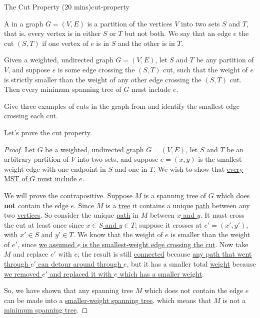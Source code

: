 \documentclass{tufte-handout}
\begin{document}
\begin{model*}{The Cut Property (20 mins)}{cut-property}
  \begin{center}
    
  \end{center}

  \begin{defn}
    A  in a graph $G = (V,E)$ is a partition of the vertices
    $V$ into two sets $S$ and $T$, that is, every vertex is in either
    $S$ or $T$ but not both.  We say that an edge $e$ 
    the cut $(S,T)$ if one vertex of $e$ is in $S$ and the other is in
    $T$.
  \end{defn}

  \begin{thm}
    Given a weighted, undirected graph $G = (V,E)$, let $S$ and $T$ be
    any partition of $V$, and suppose $e$ is some edge crossing the
    $(S,T)$ cut, such that the weight of $e$ is strictly smaller than
    the weight of any other edge crossing the $(S,T)$ cut.  Then every
    minimum spanning tree of $G$ must include $e$.
  \end{thm}
\end{model*}

\begin{questions}
\item Give three examples of cuts in the graph from
   and identify the smallest edge crossing
  each cut.
\end{questions}

Let's prove the cut property.

\newcommand{\filled}[1]{\underline{#1}}

\begin{proof}
  Let $G$ be a weighted, undirected graph $G = (V,E)$, let $S$ and $T$
  be an arbitrary partition of $V$ into two sets, and suppose
  $e = (x,y)$ is the smallest-weight edge with one endpoint in $S$ and
  one in $T$.  We wish to show that \filled{every MST of $G$ must
    include $e$}.

  We will prove the contrapositive. Suppose $M$ is a spanning tree of
  $G$ which does \textbf{not} contain the edge $e$.  Since $M$ is a
  \filled{tree} it contains a unique \filled{path} between any two
  \filled{vertices}. So consider the unique \filled{path} in $M$
  between \filled{$x$ and $y$}. It must cross the cut at least once
  since \filled{$x \in S$ and $y \in T$}; suppose it crosses at
  $e' = (x',y')$, with $x' \in S$ and $y' \in T$.  We know that the
  weight of $e$ is smaller than the weight of $e'$, since \filled{we
    assumed $e$ is the smallest-weight edge crossing the cut}. Now
  take $M$ and replace \filled{$e'$} with \filled{$e$}; the result is
  still \filled{connected} because \filled{any path that went through
    $e'$ can detour around through $e$}, but it has a smaller total
  \filled{weight} because \filled{we removed $e'$ and replaced it with
  $e$ which has a smaller weight}.

So, we have shown that any spanning tree $M$ which does not contain
the edge $e$ can be made into a \filled{smaller-weight spanning tree},
which means that $M$ is not a \filled{minimum spanning tree}.
\end{proof}
\end{document}
